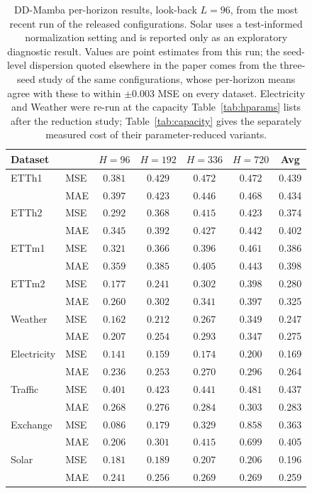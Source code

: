 \documentclass[review,12pt]{elsarticle}
\newcommand{\model}{DD-Mamba}
\begin{document}
\begin{table}[tb]
\centering
\caption{\model{} per-horizon results, look-back $L{=}96$, from the most
recent run of the released configurations. Solar uses a test-informed
normalization setting and is reported only as an exploratory diagnostic
result. Values are point estimates from this run; the seed-level dispersion
quoted elsewhere in the paper comes from the three-seed study of the same
configurations, whose per-horizon means agree with these to within
$\pm0.003$ MSE on every dataset. Electricity and Weather were re-run at the
capacity Table~\ref{tab:hparams} lists after the reduction study;
Table~\ref{tab:capacity} gives the separately measured cost of their
parameter-reduced variants.}
\label{tab:horizons}
\scriptsize
\setlength{\tabcolsep}{3.0pt}
\begin{tabular}{@{}llccccc@{}}
\toprule
Dataset & & $H{=}96$ & $H{=}192$ & $H{=}336$ & $H{=}720$ & Avg \\
\midrule
ETTh1 & MSE & $0.381$ & $0.429$ & $0.472$ & $0.472$ & 0.439 \\
 & MAE & $0.397$ & $0.423$ & $0.446$ & $0.468$ & 0.434 \\
ETTh2 & MSE & $0.292$ & $0.368$ & $0.415$ & $0.423$ & 0.374 \\
 & MAE & $0.345$ & $0.392$ & $0.427$ & $0.442$ & 0.402 \\
ETTm1 & MSE & $0.321$ & $0.366$ & $0.396$ & $0.461$ & 0.386 \\
 & MAE & $0.359$ & $0.385$ & $0.405$ & $0.443$ & 0.398 \\
ETTm2 & MSE & $0.177$ & $0.241$ & $0.302$ & $0.398$ & 0.280 \\
 & MAE & $0.260$ & $0.302$ & $0.341$ & $0.397$ & 0.325 \\
Weather & MSE & $0.162$ & $0.212$ & $0.267$ & $0.349$ & 0.247 \\
 & MAE & $0.207$ & $0.254$ & $0.293$ & $0.347$ & 0.275 \\
Electricity & MSE & $0.141$ & $0.159$ & $0.174$ & $0.200$ & 0.169 \\
 & MAE & $0.236$ & $0.253$ & $0.270$ & $0.296$ & 0.264 \\
Traffic & MSE & $0.401$ & $0.423$ & $0.441$ & $0.481$ & 0.437 \\
 & MAE & $0.268$ & $0.276$ & $0.284$ & $0.303$ & 0.283 \\
Exchange & MSE & $0.086$ & $0.179$ & $0.329$ & $0.858$ & 0.363 \\
 & MAE & $0.206$ & $0.301$ & $0.415$ & $0.699$ & 0.405 \\
Solar & MSE & $0.181$ & $0.189$ & $0.207$ & $0.206$ & 0.196 \\
 & MAE & $0.241$ & $0.256$ & $0.269$ & $0.269$ & 0.259 \\
\bottomrule
\end{tabular}
\end{table}
\end{document}
